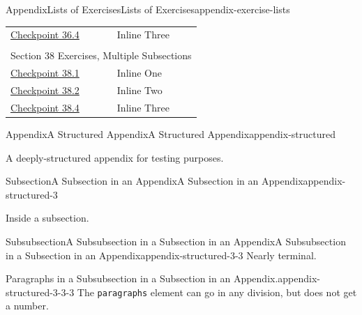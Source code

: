 \documentclass[twoside,10pt,]{article}
\newcommand{\mono}[1]{\texttt{#1}}
\numberwithin{equation}{section}
\begin{document}
\begin{appendixptx}{Appendix}{Lists of Exercises}{}{Lists of Exercises}{}{}{appendix-exercise-lists}
\begin{longtable}[l]{ll}
\hyperref[section-exercises-single-9]{Checkpoint 36.4}& Inline Three\\
\multicolumn{2}{l}{\null}\\[1.5ex] \multicolumn{2}{l}{\large Section 38 Exercises, Multiple Subsections}\\[0.5ex]
\hyperref[section-exercises-multiple-3-2]{Checkpoint 38.1}& Inline One\\
\hyperref[section-exercises-multiple-3-4]{Checkpoint 38.2}& Inline Two\\
\hyperref[exercise-duplicate-inline]{Checkpoint 38.4}& Inline Three\\
\end{longtable}
\end{appendixptx}
%
%
\typeout{************************************************}
\typeout{************************************************}
%
\begin{appendixptx}{Appendix}{A Structured Appendix}{}{A Structured Appendix}{}{}{appendix-structured}
\renewcommand*{\appendixname}{Appendix}
\begin{introduction}{}%
A deeply-structured appendix for testing purposes.%
\end{introduction}%
%
%
\typeout{************************************************}
\typeout{************************************************}
%
\begin{subsectionptx}{Subsection}{A Subsection in an Appendix}{}{A Subsection in an Appendix}{}{}{appendix-structured-3}
\begin{introduction}{}%
Inside a subsection.%
\end{introduction}%
%
%
\typeout{************************************************}
\typeout{************************************************}
%
\begin{subsubsectionptx}{Subsubsection}{A Subsubsection in a Subsection in an Appendix}{}{A Subsubsection in a Subsection in an Appendix}{}{}{appendix-structured-3-3}
Nearly terminal.%
\begin{paragraphs}{Paragraphs in a Subsubsection in a Subsection in an Appendix.}{appendix-structured-3-3-3}%
The \mono{paragraphs} element can go in any division, but does not get a number.%
\end{paragraphs}%
\end{subsubsectionptx}
\end{subsectionptx}
\end{appendixptx}
\end{document}
